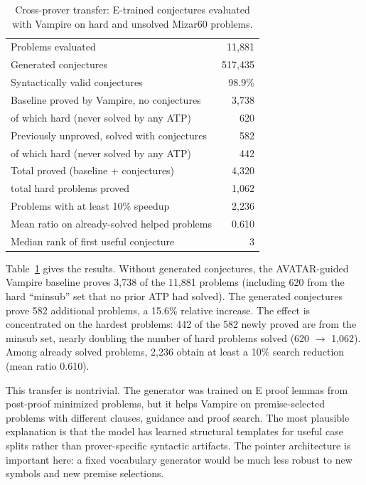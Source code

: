 \documentclass{easychair}
\newcommand{\Eprover}{E\xspace}
\newcommand{\Vampire}{Vampire\xspace}
\begin{document}
\begin{table}[t]
\centering
\caption{Cross-prover transfer: \Eprover-trained conjectures evaluated
with \Vampire on hard and unsolved Mizar60 problems.}
\label{tab:vampire}
\small
\begin{tabular}{lr}
\toprule
Problems evaluated & 11,881 \\
Generated conjectures & 517,435 \\
Syntactically valid conjectures & 98.9\% \\
\midrule
Baseline proved by \Vampire, no conjectures & 3,738 \\
\quad of which hard (never solved by any ATP) & 620 \\
Previously unproved, solved with conjectures & 582 \\
\quad of which hard (never solved by any ATP) & 442 \\
Total proved (baseline + conjectures) & 4,320 \\
\quad total hard problems proved & 1,062 \\
Problems with at least 10\% speedup & 2,236 \\
Mean ratio on already-solved helped problems & 0.610 \\
Median rank of first useful conjecture & 3 \\
\bottomrule
\end{tabular}
\end{table}

Table~\ref{tab:vampire} gives the results.  Without generated
conjectures, the AVATAR-guided \Vampire baseline proves 3,738 of the
11,881 problems (including 620 from the hard ``minsub'' set that no
prior ATP had solved).  The generated conjectures prove 582 additional
problems, a 15.6\% relative increase.  The effect is concentrated on
the hardest problems: 442 of the 582 newly proved are from the minsub
set, nearly doubling the number of hard problems solved (620 $\to$
1,062).  Among already solved problems, 2,236 obtain at least a 10\%
search reduction (mean ratio 0.610).

This transfer is nontrivial.  The generator was trained on \Eprover
proof lemmas from post-proof minimized problems, but it helps \Vampire
on premise-selected problems with different clauses, guidance and proof
search.  The most plausible explanation is that the model has learned
structural templates for useful case splits rather than prover-specific
syntactic artifacts.  The pointer architecture is important here: a
fixed vocabulary generator would be much less robust to new symbols and
new premise selections.
\end{document}
